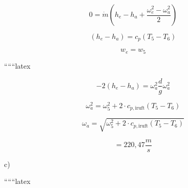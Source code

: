 \[
0 = \dot{m} \left( h_e - h_a + \frac{\omega_e^2 - \omega_a^2}{2} \right)
\]

\[
(h_e - h_a) = c_p \left( T_5 - T_6 \right)
\]

\[
w_e = w_5
\]

``````latex


\[
-2 \left( h_e - h_a \right) = \omega_a^2 \frac{d}{g} \omega_a^2
\]

\[
\omega_a^2 = \omega_5^2 + 2 \cdot c_{p, \text{iruft}} \left( T_5 - T_6 \right)
\]

\[
\omega_a = \sqrt{\omega_5^2 + 2 \cdot c_{p, \text{iruft}} \left( T_5 - T_6 \right)}
\]

\[
= 220,47 \frac{m}{s}
\]

c)

``````latex



